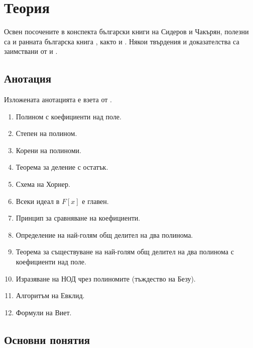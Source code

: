 \documentclass{../../common/topic}
\begin{document}
\maketitle

\section{Теория}

Освен посочените в конспекта български книги на Сидеров и Чакърян, полезни са и ранната българска книга \cite{Обрешков1962ВисшаАлгебра}, както и \cite{ГеновМиховскиМоллов1991Алгебра}. Някои твърдения и доказателства са заимствани от \cite{Knapp2016BasicAlgebra} и \cite{RoyachkiNotes}.

\subsection{Анотация}

Изложената анотацията е взета от \cite{Syllabus}.

\begin{enumerate}
  \item Полином с коефициенти над поле.
  \item Степен на полином.
  \item Корени на полиноми.
  \item Теорема за деление с остатък.
  \item Схема на Хорнер.
  \item Всеки идеал в \( F[x] \) е главен.
  \item Принцип за сравняване на коефициенти.
  \item Определение на най-голям общ делител на два полинома.
  \item Теорема за съществуване на най-голям общ делител на два полинома с коефициенти над поле.
  \item Изразяване на НОД чрез полиномите (тъждество на Безу).
  \item Алгоритъм на Евклид.
  \item Формули на Виет.
\end{enumerate}

\subsection{Основни понятия}
\end{document}
